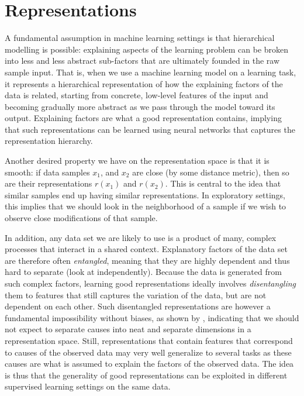 
\section{Representations}
\label{sec:representations}
A fundamental assumption in machine learning settings is that hierarchical modelling is possible: explaining aspects of the learning problem can be broken into less and less abstract sub-factors that are ultimately founded in the raw sample input. That is, when we use a machine learning model on a learning task, it represents a hierarchical representation of how the explaining factors of the data is related, starting from concrete, low-level features of the input and becoming gradually more abstract as we pass through the model toward its output. Explaining factors are what a good representation contains, implying that such representations can be learned using neural networks that captures the representation hierarchy.

Another desired property we have on the representation space is that it is smooth: if data samples $x_1$, and $x_2$ are close (by some distance metric), then so are their representations $r(x_1)$ and $r(x_2)$. This is central to the idea that similar samples end up having similar representations. In exploratory settings, this implies that we should look in the neighborhood of a sample if we wish to observe close modifications of that sample.

In addition, any data set we are likely to use is a product of many, complex processes that interact in a shared context. Explanatory factors of the data set are therefore often \textit{entangled}, meaning that they are highly dependent and thus hard to separate (look at independently). Because the data is generated from such complex factors, learning good representations ideally involves \textit{disentangling} them to features that still captures the variation of the data, but are not dependent on each other. Such disentangled representations are however a fundamental impossibility without biases, as shown by \textcite{locatello2018challenging}, indicating that we should not expect to separate causes into neat and separate dimensions in a representation space. Still, representations that contain features that correspond to causes of the observed data may very well generalize to several tasks as these causes are what is assumed to explain the factors of the observed data. The idea is thus that the generality of good representations can be exploited in different supervised learning settings on the same data.


